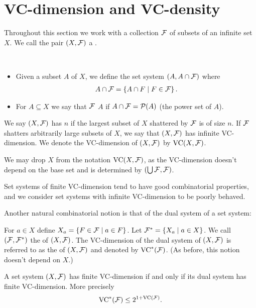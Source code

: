 \section{VC-dimension and VC-density}
Throughout this section we work with a collection $\mathcal F$ of subsets of an infinite set $X$.
We call the pair $(X, \mathcal F)$ a .

\begin{Definition} \ 
  \begin{itemize} 
  \item Given a subset $A$ of $X$, we define the set system $(A, A \cap \mathcal F)$
    where
    \begin{align*}
      A \cap \mathcal F = \left\{A \cap F \mid F\in \mathcal F\right\}.      
    \end{align*}
  \item For $A \subseteq X$ we say that $\mathcal F$  $A$ if $A \cap \mathcal F = \mathcal P(A)$ (the power set of $A$).
  \end{itemize}    
\end{Definition}  

\begin{Definition}
  We say $(X, \mathcal F)$ has  $n$ if the largest subset of $X$ shattered by $\mathcal F$ is of size $n$.
  If $\mathcal F$ shatters arbitrarily large subsets of $X$, we say that $(X, \mathcal F)$ has infinite VC-dimension.
  We denote the VC-dimension of $(X, \mathcal F)$ by $\operatorname{VC}(X, \mathcal F)$.
\end{Definition}  

\begin{Note}
  We may drop $X$ from the notation $\operatorname{VC}(X, \mathcal F)$, as the VC-dimension doesn't depend on the base set and is determined by $(\bigcup \mathcal F, \mathcal F)$.
\end{Note}
Set systems of finite VC-dimension tend to have good combinatorial properties,
and we consider set systems with infinite VC-dimension to be poorly behaved.

Another natural combinatorial notion is that of the dual system of a set system:
\begin{Definition}
  For $a \in X$ define $X_a = \left\{F \in \mathcal F \mid a \in F\right\}$.
  Let $\mathcal F^* = \left\{X_a \mid a \in X\right\}$.
  We call $(\mathcal F, \mathcal F^*)$ the  of $(X, \mathcal F)$.
  The VC-dimension of the dual system of $(X, \mathcal F)$ is referred to as the  of $(X, \mathcal F)$ and denoted by $\operatorname{VC}^*(\mathcal F)$.
  (As before, this notion doesn't depend on $X$.)
\end{Definition}  

\begin{Lemma} 
  A set system $(X, \mathcal F)$ has finite VC-dimension if and only if its dual system has finite VC-dimension.
  More precisely
  \begin{align*}
    \operatorname{VC}^*(\mathcal F) \leq 2^{1+\operatorname{VC}(\mathcal F)}.
  \end{align*}
\end{Lemma}

